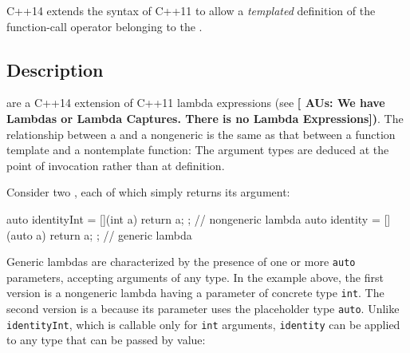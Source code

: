 
\label{generic-lambdas}
\setcounter{table}{0}
\setcounter{footnote}{0}
\setcounter{lstlisting}{0}



C++14 extends the  syntax of C++11 to allow a
\emph{templated} definition of the function-call operator belonging to
the .

\subsection[Description]{Description}\label{description}

 are a C++14 extension of C++11 lambda
expressions (see \featureref{}{}\textbf{[ AUs: We have Lambdas or Lambda Captures. There is no Lambda Expressions])}. The relationship
between a  and a nongeneric  is the same as that between a function template and a
nontemplate function: The argument types are deduced at the point of
invocation rather than at definition.

Consider two , each of which simply returns
its argument:

\begin{emcppslisting}[emcppsbatch=e1,emcppsstandards={c++14}]
auto identityInt = [](int  a) { return a; };  // nongeneric lambda
auto identity =    [](auto a) { return a; };  // generic lambda
\end{emcppslisting}
    

\noindent Generic lambdas are characterized by the presence of one or more
\lstinline!auto! parameters, accepting arguments of any type. In the
example above, the first version is a nongeneric lambda having a
parameter of concrete type \lstinline!int!. The second version is a
 because its parameter uses the placeholder type
\lstinline!auto!. Unlike \lstinline!identityInt!, which is callable only for
\lstinline!int! arguments, \lstinline!identity! can be applied to any type
that can be passed by value:


